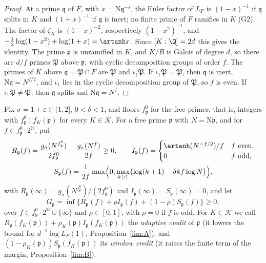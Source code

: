 \begin{proof}
At a prime $\mathfrak q$ of $F$, with $x=\mathrm N\mathfrak q^{-s}$, the Euler
factor of $L_F$ is $(1-x)^{-1}$ if $\mathfrak q$ splits in $K$ and
$(1+x)^{-1}$ if $\mathfrak q$ is inert; no finite prime of $F$ ramifies in $K$
(G2). The factor of $\zeta_K$ is $(1-x)^{-2}$, respectively
$(1-x^2)^{-1}$, and $-\frac12\log(1-x^2)+\log(1+x)=\artanh x$. Since
$[K:\Q]=2d$ this gives the identity. The prime $\mathfrak p$ is unramified in
$K$, and $K/B$ is Galois of degree $d$, so there are $d/f$ primes $\mathfrak
P$ above $\mathfrak p$, with cyclic decomposition groups of order $f$. The
primes of $K$ above $\mathfrak q=\mathfrak P\cap F$ are $\mathfrak P$ and
$\iota_1\mathfrak P$. If $\iota_1\mathfrak P=\mathfrak P$, then $\mathfrak q$
is inert, $\mathrm N\mathfrak q=N^{f/2}$, and $\iota_1$ lies in the cyclic
decomposition group of $\mathfrak P$, so $f$ is even. If
$\iota_1\mathfrak P\ne\mathfrak P$, then $\mathfrak q$ splits and
$\mathrm N\mathfrak q=N^f$.
\end{proof}

\begin{definition}\label{lim:credits}
Fix $\sigma=1+\varepsilon\in(1,2]$, $0<\delta<1$, and floors $f^0_{\mathfrak
p}$ for the free primes, that is, integers with $f^0_{\mathfrak p}\mid
f_K(\mathfrak p)$ for every $K\in\mathcal K$. For a free prime $\mathfrak p$
with $N=\mathrm N\mathfrak p$, and for $f\in f^0_{\mathfrak p}\cdot2^{\mathbb
N}$, put
\[
 \begin{gathered}
 R_{\mathfrak p}(f)=\frac{g_\sigma(N^{f^0_{\mathfrak p}})}{2f^0_{\mathfrak p}}
 -\frac{g_\sigma(N^f)}{2f}\ge0,
 \qquad
 I_{\mathfrak p}(f)=\begin{cases}\artanh(N^{-f/2})/f&f\text{ even},\\0&f\text{ odd},\end{cases}\\
 S_{\mathfrak p}(f)=\frac1{2f}\max\Bigl(0,\max_{k\ge1}\bigl(\log(k+1)-\delta kf\log N\bigr)\Bigr),
 \end{gathered}
\]
with $R_{\mathfrak p}(\infty)=g_\sigma(N^{f^0_{\mathfrak p}})/(2f^0_{\mathfrak
p})$ and $I_{\mathfrak p}(\infty)=S_{\mathfrak p}(\infty)=0$, and let
\[
 G_{\mathfrak p}=\inf\bigl\{R_{\mathfrak p}(f)+\rho I_{\mathfrak p}(f)
 +(1-\rho)S_{\mathfrak p}(f)\bigr\}\ge0,
\]
over $f\in f^0_{\mathfrak p}\cdot2^{\mathbb N}\cup\{\infty\}$ and
$\rho\in[0,1]$, with $\rho=0$ if $f$ is odd. For $K\in\mathcal K$ we call
$R_{\mathfrak p}(f_K(\mathfrak p))+\rho_K(\mathfrak p)I_{\mathfrak
p}(f_K(\mathfrak p))$ the \emph{adaptive credit} of $\mathfrak p$ (it lowers
the bound for $d^{-1}\log L_F(1)$, Proposition~\ref{lim:A}), and
$(1-\rho_K(\mathfrak p))S_{\mathfrak p}(f_K(\mathfrak p))$ its \emph{window
credit} (it raises the finite term of the margin, Proposition~\ref{lim:B}).
\end{definition}

